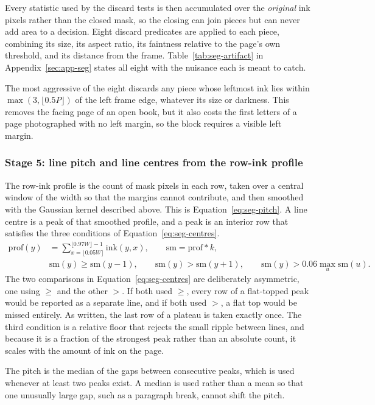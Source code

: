 Every statistic used by the discard tests is then accumulated over the \emph{original} ink pixels rather than the closed mask, so the closing can join pieces but can never add area to a decision. Eight discard predicates are applied to each piece, combining its size, its aspect ratio, its faintness relative to the page's own threshold, and its distance from the frame. Table~\ref{tab:seg-artifact} in Appendix~\ref{sec:app-seg} states all eight with the nuisance each is meant to catch.

The most aggressive of the eight discards any piece whose leftmost ink lies within $\max(3,\lfloor0.5P\rfloor)$ of the left frame edge, whatever its size or darkness. This removes the facing page of an open book, but it also costs the first letters of a page photographed with no left margin, so the block requires a visible left margin.

\subsubsection{Stage 5: line pitch and line centres from the row-ink profile}

The row-ink profile is the count of mask pixels in each row, taken over a central window of the width so that the margins cannot contribute, and then smoothed with the Gaussian kernel described above. This is Equation~\ref{eq:seg-pitch}. A line centre is a peak of that smoothed profile, and a peak is an interior row that satisfies the three conditions of Equation~\ref{eq:seg-centres}.
\begin{align}
\mathrm{prof}(y)&=\sum_{x=\lfloor0.05W\rfloor}^{\lfloor0.97W\rfloor-1}\mathrm{ink}(y,x),\qquad \mathrm{sm}=\mathrm{prof}*k,\label{eq:seg-pitch}\\
&\mathrm{sm}(y)\ge\mathrm{sm}(y-1),\qquad \mathrm{sm}(y)>\mathrm{sm}(y+1),\qquad \mathrm{sm}(y)>0.06\max_u\mathrm{sm}(u).\label{eq:seg-centres}
\end{align}
The two comparisons in Equation~\ref{eq:seg-centres} are deliberately asymmetric, one using $\ge$ and the other $>$. If both used $\ge$, every row of a flat-topped peak would be reported as a separate line, and if both used $>$, a flat top would be missed entirely. As written, the last row of a plateau is taken exactly once. The third condition is a relative floor that rejects the small ripple between lines, and because it is a fraction of the strongest peak rather than an absolute count, it scales with the amount of ink on the page.

The pitch is the median of the gaps between consecutive peaks, which is used whenever at least two peaks exist. A median is used rather than a mean so that one unusually large gap, such as a paragraph break, cannot shift the pitch.

